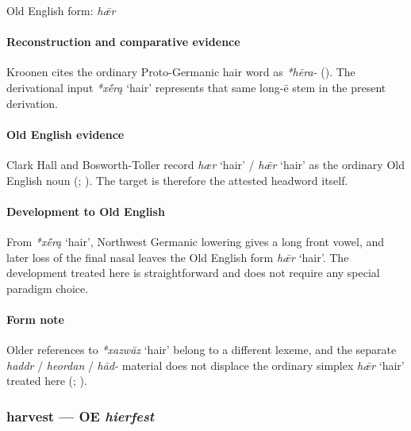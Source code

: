 \documentclass[
  british,
  a4paper,
]{article}
\providecommand{\Recon}[1]{\emph{*#1}}
\begin{document}
Old English form: \emph{hǣr}

\paragraph{Reconstruction and comparative
evidence}\label{reconstruction-and-comparative-evidence-28}

Kroonen cites the ordinary Proto-Germanic hair word as \emph{*hēra-}
(). The derivational input
\Recon{xḗrą} `hair' represents that same long-ē stem in the present
derivation.

\paragraph{Old English evidence}\label{old-english-evidence-28}

Clark Hall and Bosworth-Toller record \emph{hær} `hair' / \emph{hǣr}
`hair' as the ordinary Old English noun
(;
). The
target is therefore the attested headword itself.

\paragraph{Development to Old
English}\label{development-to-old-english-28}

From \Recon{xḗrą} `hair', Northwest Germanic lowering gives a long front
vowel, and later loss of the final nasal leaves the Old English form
\emph{hǣr} `hair'. The development treated here is straightforward and
does not require any special paradigm choice.

\paragraph{Form note}\label{form-note-5}

Older references to \Recon{xazwăz} `hair' belong to a different lexeme,
and the separate \emph{haddr} / \emph{heordan} / \emph{hād-} material
does not displace the ordinary simplex \emph{hǣr} `hair' treated here
(;
).

\subsubsection{\texorpdfstring{harvest --- OE
\emph{hierfest}}{harvest --- OE hierfest}}\label{harvest-oe-hierfest}
\end{document}
